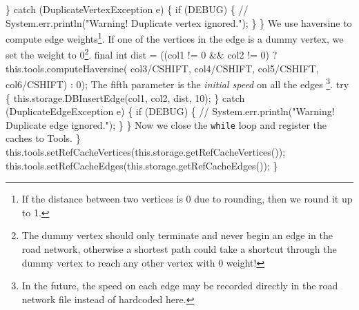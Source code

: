 \} catch (DuplicateVertexException e) \{
  if (DEBUG) \{
    // System.err.println("Warning! Duplicate vertex ignored.");
  \}
\}
\nwendcode{}\nwdocspar
{\small We use haversine to compute edge weights\footnote{If the distance between two
vertices is 0 due to rounding, then we round it up to 1.}.  If one of the
vertices in the edge is a dummy vertex, we set the weight to 0\footnote{The
dummy vertex should only terminate and never begin an edge in the road network,
otherwise a shortest path could take a shortcut through the dummy vertex to
reach any other vertex with 0 weight!}.}
\nwenddocs{}\plusendmoddef
final int dist = ((col1 != 0 && col2 != 0)
  ? this.tools.computeHaversine(
        col3/CSHIFT, col4/CSHIFT,
        col5/CSHIFT, col6/CSHIFT) : 0);
\nwendcode{}\nwdocspar
{\small The fifth parameter is the \textit{initial speed} on all the edges
\footnote{In the future, the speed on each edge may be recorded directly in the
road network file instead of hardcoded here.}.}
\nwenddocs{}\plusendmoddef
try \{
  this.storage.DBInsertEdge(col1, col2, dist, 10);
\} catch (DuplicateEdgeException e) \{
  if (DEBUG) \{
    // System.err.println("Warning! Duplicate edge ignored.");
  \}
\}
\nwendcode{}\nwdocspar
{\small Now we close the {\tt{}while} loop and register the caches to Tools.}
\nwenddocs{}\plusendmoddef
  \}
  this.tools.setRefCacheVertices(this.storage.getRefCacheVertices());
  this.tools.setRefCacheEdges(this.storage.getRefCacheEdges());
\}
\nwendcode{}\nwdocspar

